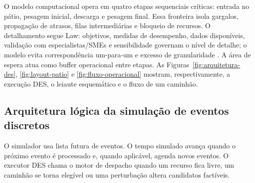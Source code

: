 \documentclass[
  12pt,
  oneside,
  a4paper,
  sumario=tradicional,
  brazil
]{abntex2}
\begin{document}
O modelo computacional opera em quatro etapas sequenciais cr\'iticas: entrada no p\'atio, pesagem inicial, descarga e pesagem final. Essa fronteira isola gargalos, propaga\c{c}\~ao de atrasos, filas intermedi\'arias e bloqueio de recursos. O detalhamento segue Law: objetivos, medidas de desempenho, dados dispon\'iveis, valida\c{c}\~ao com especialistas/SMEs e sensibilidade governam o n\'ivel de detalhe; o modelo evita correspond\^encia um-para-um e excesso de granularidade \parencite[Sec.~5.2, p.~249--251]{lawSimulationModelingAnalysis2015}. A \'area de espera atua como buffer operacional entre etapas. As Figuras~\ref{fig:arquitetura-des}, \ref{fig:layout-patio} e \ref{fig:fluxo-operacional} mostram, respectivamente, a execu\c{c}\~ao DES, o leiaute esquem\'atico e o fluxo de um caminh\~ao.

\subsection{Arquitetura lógica da simulação de eventos discretos}

O simulador usa lista futura de eventos. O tempo simulado avan\c{c}a quando o pr\'oximo evento \'e processado e, quando aplic\'avel, agenda novos eventos. O executor DES chama o motor de despacho quando um recurso fica livre, um caminh\~ao se torna eleg\'ivel ou uma perturba\c{c}\~ao altera candidatos fact\'iveis.
\end{document}
